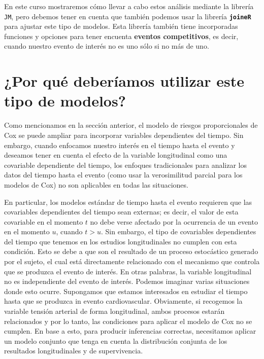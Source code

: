 \documentclass[
]{book}
\begin{document}
En este curso mostraremos cómo llevar a cabo estos análisis mediante la librería \texttt{JM}, pero debemos tener en cuenta que también podemos usar la librería \textbf{\texttt{joineR}} para ajustar este tipo de modelos. Esta librería también tiene incorporadas funciones y opciones para tener encuenta \textbf{eventos competitivos}, es decir, cuando nuestro evento de interés no es uno sólo si no más de uno.

\hypertarget{por-quuxe9-deberuxedamos-utilizar-este-tipo-de-modelos}{%
\section{¿Por qué deberíamos utilizar este tipo de modelos?}\label{por-quuxe9-deberuxedamos-utilizar-este-tipo-de-modelos}}

Como mencionamos en la sección anterior, el modelo de riesgos proporcionales de Cox se puede ampliar para incorporar variables dependientes del tiempo. Sin embargo, cuando enfocamos nuestro interés en el tiempo hasta el evento y deseamos tener en cuenta el efecto de la variable longitudinal como una covariable dependiente del tiempo, los enfoques tradicionales para analizar los datos del tiempo hasta el evento (como usar la verosimilitud parcial para los modelos de Cox) no son aplicables en todas las situaciones.

En particular, los modelos estándar de tiempo hasta el evento requieren que las covariables dependientes del tiempo sean externas; es decir, el valor de esta covariable en el momento \(t\) no debe verse afectado por la ocurrencia de un evento en el momento \(u\), cuando \(t>u\). Sin embargo, el tipo de covariables dependientes del tiempo que tenemos en los estudios longitudinales no cumplen con esta condición. Esto se debe a que son el resultado de un proceso estocástico generado por el sujeto, el cual está directamente relacionado con el mecanismo que controla que se produzca el evento de interés. En otras palabras, la variable longitudinal no es independiente del evento de interés. Podemos imaginar varias situaciones donde esto ocurre. Supongamos que estamos interesados en estudiar el tiempo hasta que se produzca in evento cardiovascular. Obviamente, si recogemos la variable tensión arterial de forma longitudinal, ambos procesos estarán relacionados y por lo tanto, las condiciones para aplicar el modelo de Cox no se cumplen. En base a esto, para producir inferencias correctas, necesitamos aplicar un modelo conjunto que tenga en cuenta la distribución conjunta de los resultados longitudinales y de supervivencia.
\end{document}
